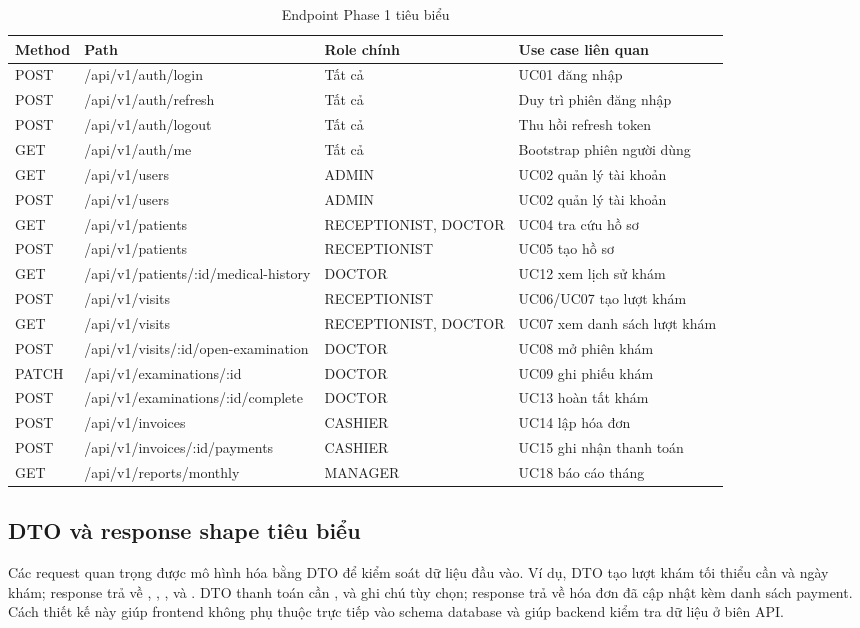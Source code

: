 \begin{longtable}{|p{2cm}|p{5.2cm}|p{3cm}|p{4.2cm}|}
\caption{Endpoint Phase 1 tiêu biểu}\\
\hline
\textbf{Method} & \textbf{Path} & \textbf{Role chính} & \textbf{Use case liên quan} \\
\hline
POST & /api/v1/auth/login & Tất cả & UC01 đăng nhập \\
\hline
POST & /api/v1/auth/refresh & Tất cả & Duy trì phiên đăng nhập \\
\hline
POST & /api/v1/auth/logout & Tất cả & Thu hồi refresh token \\
\hline
GET & /api/v1/auth/me & Tất cả & Bootstrap phiên người dùng \\
\hline
GET & /api/v1/users & ADMIN & UC02 quản lý tài khoản \\
\hline
POST & /api/v1/users & ADMIN & UC02 quản lý tài khoản \\
\hline
GET & /api/v1/patients & RECEPTIONIST, DOCTOR & UC04 tra cứu hồ sơ \\
\hline
POST & /api/v1/patients & RECEPTIONIST & UC05 tạo hồ sơ \\
\hline
GET & /api/v1/patients/:id/medical-history & DOCTOR & UC12 xem lịch sử khám \\
\hline
POST & /api/v1/visits & RECEPTIONIST & UC06/UC07 tạo lượt khám \\
\hline
GET & /api/v1/visits & RECEPTIONIST, DOCTOR & UC07 xem danh sách lượt khám \\
\hline
POST & /api/v1/visits/:id/open-examination & DOCTOR & UC08 mở phiên khám \\
\hline
PATCH & /api/v1/examinations/:id & DOCTOR & UC09 ghi phiếu khám \\
\hline
POST & /api/v1/examinations/:id/complete & DOCTOR & UC13 hoàn tất khám \\
\hline
POST & /api/v1/invoices & CASHIER & UC14 lập hóa đơn \\
\hline
POST & /api/v1/invoices/:id/payments & CASHIER & UC15 ghi nhận thanh toán \\
\hline
GET & /api/v1/reports/monthly & MANAGER & UC18 báo cáo tháng \\
\hline
\end{longtable}

\subsection{DTO và response shape tiêu biểu}

Các request quan trọng được mô hình hóa bằng DTO để kiểm soát dữ liệu đầu vào. Ví dụ, DTO tạo lượt khám tối thiểu cần  và ngày khám; response trả về , , ,  và . DTO thanh toán cần ,  và ghi chú tùy chọn; response trả về hóa đơn đã cập nhật kèm danh sách payment. Cách thiết kế này giúp frontend không phụ thuộc trực tiếp vào schema database và giúp backend kiểm tra dữ liệu ở biên API.

